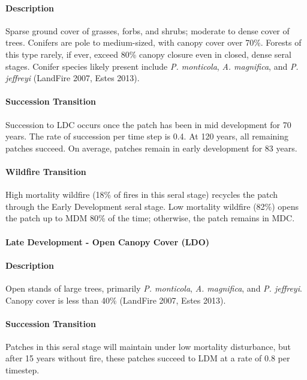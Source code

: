 \paragraph*{Description} Sparse ground cover of grasses, forbs, and shrubs; moderate to dense cover of trees. Conifers are pole to medium-sized, with canopy cover over 70\%. Forests of this type rarely, if ever, exceed 80\% canopy closure even in closed, dense seral stages. Conifer species likely present include \emph{P. monticola}, \emph{A. magnifica}, and \emph{P. jeffreyi} (LandFire 2007, Estes 2013).

\paragraph*{Succession Transition} Succession to LDC occurs once the patch has been in mid development for 70 years. The rate of succession per time step is 0.4. At 120 years, all remaining patches succeed. On average, patches remain in early development for 83 years.

\paragraph*{Wildfire Transition} High mortality wildfire (18\% of fires in this seral stage) recycles the patch through the Early Development seral stage. Low mortality wildfire (82\%) opens the patch up to MDM 80\% of the time; otherwise, the patch remains in MDC.

\noindent\hrulefill


\paragraph*{Late Development - Open Canopy Cover (LDO)}

\paragraph*{Description} Open stands of large trees, primarily \emph{P. monticola}, \emph{A. magnifica}, and \emph{P. jeffreyi}. Canopy cover is less than 40\% (LandFire 2007, Estes 2013).

\paragraph*{Succession Transition} Patches in this seral stage will maintain under low mortality disturbance, but after 15 years without fire, these patches succeed to LDM at a rate of 0.8 per timestep.

